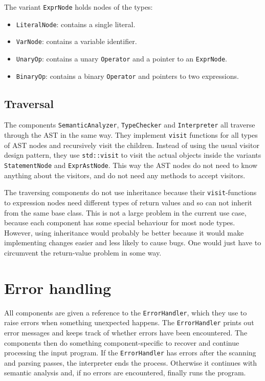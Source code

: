 \documentclass[a4paper]{article}
\newcommand*{\code}[1]{\texttt{#1}}
\begin{document}
The variant \code{ExprNode} holds nodes of the types:
\begin{itemize}
  \item \code{LiteralNode}: contains a single literal.
  \item \code{VarNode}: contains a variable identifier.
  \item \code{UnaryOp}: contains a unary \code{Operator} and a pointer to an 
  \code{ExprNode}.
  \item \code{BinaryOp}: contains a binary \code{Operator} and 
  pointers to two expressions. 
\end{itemize}

\subsection{Traversal}

The components \code{SemanticAnalyzer}, \code{TypeChecker} and 
\code{Interpreter} all traverse through the AST in the same way. 
They implement \code{visit} functions for all types of AST nodes 
and recursively visit the children.
Instead of using the usual visitor design pattern, they use 
\code{std::visit} to visit the actual objects inside the variants
\code{StatementNode} and \code{ExprAstNode}. This way the 
AST nodes do not need to know anything about the visitors, 
and do not need any methods to accept visitors. 

The traversing 
components do not use inheritance because their \code{visit}-functions 
to expression nodes need different types of return values and 
so can not inherit from the same base class. This is not a large 
problem in the current use case, because each component has 
some special behaviour for most node types. However, using 
inheritance would probably be better because it would make 
implementing changes easier and less likely to cause bugs.
One would just have to circumvent the return-value problem in some way.

\label{sect:errors}
\section{Error handling}

All components are given a reference to the \code{ErrorHandler}, 
which they use to raise errors when something unexpected happens.
The \code{ErrorHandler} prints out error messages and keeps track 
of whether errors have been encountered. 
The components then do something component-specific to recover and 
continue processing the input program. If the \code{ErrorHandler} 
has errors after the scanning and parsing passes, the interpreter 
ends the process. Otherwise it continues with semantic analysis 
and, if no errors are encountered, finally runs the program.
\end{document}
